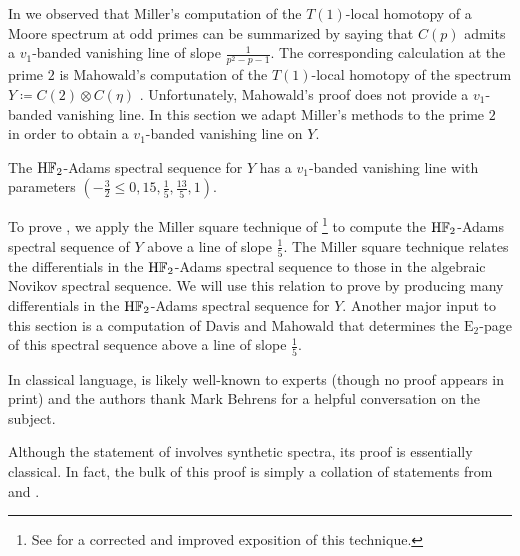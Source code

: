 
In  we observed that Miller's computation of the $T(1)$-local homotopy of a Moore spectrum at odd primes \cite{Miller} can be summarized by saying that $C(p)$ admits a $v_1$-banded vanishing line of slope $\frac{1}{p^2 - p -1}$. The corresponding calculation at the prime $2$ is Mahowald's computation of the $T(1)$-local homotopy of the spectrum $Y \coloneqq C(2) \otimes C(\eta)$ \cite{MahJEHP}. Unfortunately, Mahowald's proof does not provide a $v_1$-banded vanishing line. In this section we adapt Miller's methods to the prime $2$ in order to obtain a $v_1$-banded vanishing line on $Y$.

\begin{thm}\label{thm:Y-v1-band}
  The $\mathrm{H}\mathbb{F}_2$-Adams spectral sequence for $Y$ has a $v_1$-banded vanishing line with parameters
  $\left(-\frac{3}{2} \leq 0, 15, \frac{1}{5}, \frac{13}{5}, 1 \right)$.
\end{thm}

To prove , we apply the Miller square technique of \cite{Miller} \footnote{See \cite[Section 9]{AndrewsMiller} for a corrected and improved exposition of this technique.} to compute the $\mathrm{H}\mathbb{F}_2$-Adams spectral sequence of $Y$ above a line of slope $\frac{1}{5}$. The Miller square technique relates the differentials in the $\mathrm{H}\mathbb{F}_2$-Adams spectral sequence to those in the algebraic Novikov spectral sequence. We will use this relation to prove  by producing many differentials in the $\mathrm{H}\mathbb{F}_2$-Adams spectral sequence for $Y$. Another major input to this section is a computation of Davis and Mahowald \cite{v1ExtDavisMahowald} that determines the $\mathrm{E}_2$-page of this spectral sequence above a line of slope $\frac{1}{5}$.

\begin{rmk}
  In classical language,  is likely well-known to experts (though no proof appears in print) and the authors thank Mark Behrens for a helpful conversation on the subject.

  Although the statement of  involves synthetic spectra,
  its proof is essentially classical.
  In fact, the bulk of this proof is simply a collation of statements from \cite{Miller} and \cite{v1ExtDavisMahowald}.
\end{rmk}

